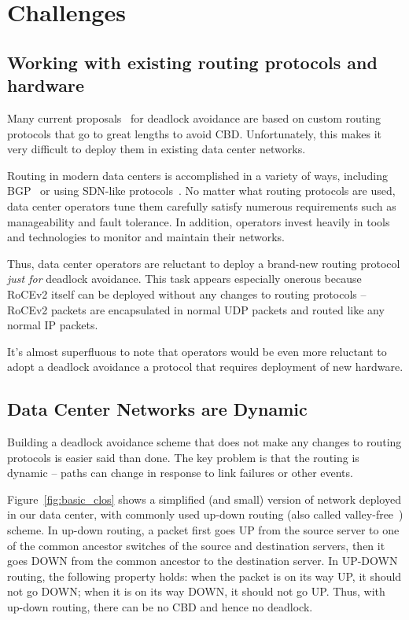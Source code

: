 \section{Challenges}
\label{sec:challenges}

\subsection{Working with existing routing protocols and hardware}
\label{sec:incremental}

Many current proposals~\cite{tcpbolt, karol2003prevention,
sancho2004,lash,wu2003fault} for deadlock avoidance are based on custom routing
protocols that go to great lengths to avoid CBD.  Unfortunately, this makes it
very difficult to deploy them in existing data center networks.

Routing in modern data centers is accomplished in a variety of ways, including
BGP~\cite{vl2, facebookrouting} or using SDN-like
protocols~\cite{singh2015jupiter}.  No matter what routing protocols are used,
data center operators tune them carefully satisfy numerous requirements such as
manageability and fault tolerance.  In addition, operators invest heavily in
tools and technologies to monitor and maintain their networks.

Thus, data center operators are reluctant to deploy a brand-new routing protocol
{\em just for} deadlock avoidance. This task appears especially onerous because
RoCEv2 itself can be deployed without any changes to routing protocols -- RoCEv2
packets are encapsulated in normal UDP packets and routed like any normal IP
packets.

It's almost superfluous to note that operators would be even more reluctant to
adopt a deadlock avoidance a protocol that requires deployment of new hardware. 

\subsection{Data Center Networks are Dynamic}\label{sec:reroute}

Building a deadlock avoidance scheme that does not make any changes to routing
protocols is easier said than done. The key problem is that the routing is
dynamic -- paths can change in response to link failures or other events.

Figure~\ref{fig:basic_clos} shows a simplified (and small) version
of network deployed in our data center, with commonly used up-down routing (also
called valley-free~\cite{qiu2007toward}) scheme.  In up-down routing, a packet first
goes UP from the source server to one of the common ancestor switches of the
source and destination servers, then it goes DOWN from the common ancestor to
the destination server.  In UP-DOWN routing, the following property holds: when
the packet is on its way UP, it should not go DOWN; when it is on its way DOWN,
it should not go UP. Thus, with up-down routing, there can be no CBD and hence
no deadlock.


